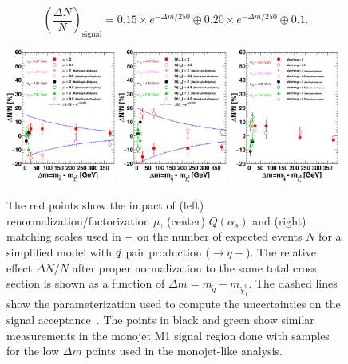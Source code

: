 \begin{equation}
\left(\frac{\Delta N}{N}\right)_{\text{signal}} = 0.15 \times e^{-{\Delta m / 250}} \oplus 0.20 \times e^{-{\Delta m / 250}} \oplus 0.1.
\label{eq:systematicAcceptanceSquark}
\end{equation}

\begin{figure}[t!]
\begin{center}
\includegraphics[width=0.32\textwidth]{Interpretations/Figures/signalUncert_mu_M1.eps}
\includegraphics[width=0.32\textwidth]{Interpretations/Figures/signalUncert_Q_M1.eps}
\includegraphics[width=0.32\textwidth]{Interpretations/Figures/signalUncert_Matching_M1.eps}
\end{center}
\caption[Parametrization of the theoretical systematic uncertainties for the squark pair production when $\squarktoq$.]{The red points show the impact of (left) renormalization/factorization $\mu$, (center) $Q(\alpha _s)$ and (right) matching scales used in \madgraph{}+\pythia{} on the number of expected events $N$ for a simplified model with $\tilde{q}$ pair production (\squark$\rightarrow q+$\ninoone). The relative effect $\Delta N/N$ after proper normalization to the same total cross section is shown as a function of $\Delta m = m_{\tilde{q}} - m_{\tilde{\chi}_1^0}$. The dashed lines show the parameterization used to compute the uncertainties on the signal acceptance~\cite{Aad:2014wea}. The points in black and green show similar measurements in the monojet M1 signal region done with \madgraph{} samples for the low $\Delta m$ points used in the monojet-like analysis.}
\label{fig:signalAcceptanceSquark}
\end{figure}


